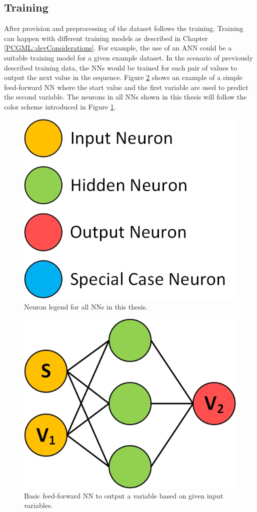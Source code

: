 \documentclass[MGS,Master,english]{twbook}%
\begin{document}
\subsection{Training}
After provision and preprocessing of the dataset follows the training. Training can happen with different training models as described in Chapter \ref{PCGML::devConsiderations}. For example, the use of an \ac{ANN} could be a suitable training model for a given example dataset. In the scenario of previously described training data, the \acp{NN} would be trained for each pair of values to output the next value in the sequence. Figure \ref{fig::PCGML::devExample::NNbasic} shows an example of a simple feed-forward \ac{NN} where the start value and the first variable are used to predict the second variable. The neurons in all \acp{NN} shown in this thesis will follow the color scheme introduced in Figure \ref{fig::neuron_legend}. 
\begin{figure}[!htbp]
	\centering
	\includegraphics[width=0.3\linewidth]{PICs/NNs/neurons_legend.jpg}
	\caption{Neuron legend for all \acp{NN} in this thesis.}\label{fig::neuron_legend}
\end{figure}
\begin{figure}[!htbp]
	\centering
	\includegraphics[width=0.3\linewidth]{PICs/NNs/PCGML_development_example_NN_basic}
	\caption{Basic feed-forward \ac{NN} to output a variable based on given input variables.}\label{fig::PCGML::devExample::NNbasic}
\end{figure}
\end{document}
